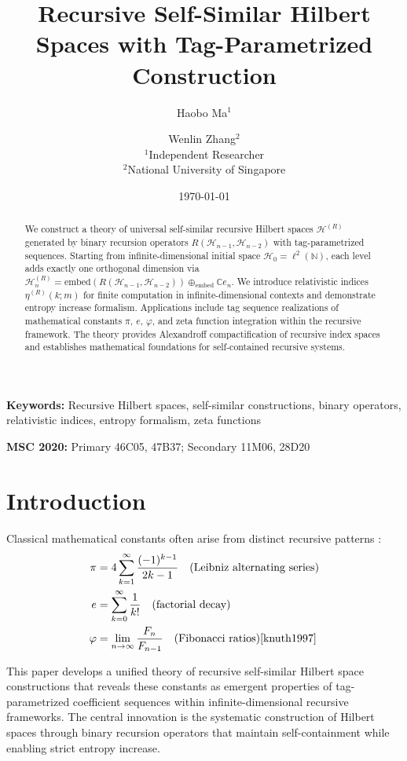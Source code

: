 \documentclass[12pt]{article}
\title{Recursive Self-Similar Hilbert Spaces with Tag-Parametrized Construction}
\author{Haobo Ma$^1$ \and Wenlin Zhang$^2$\\
\small $^1$Independent Researcher\\
\small $^2$National University of Singapore}
\date{\today}
\theoremstyle{plain}
\theoremstyle{definition}
\begin{document}
\maketitle

\begin{abstract}
We construct a theory of universal self-similar recursive Hilbert spaces $\mathcal{H}^{(R)}$ generated by binary recursion operators $R(\mathcal{H}_{n-1}, \mathcal{H}_{n-2})$ with tag-parametrized sequences. Starting from infinite-dimensional initial space $\mathcal{H}_0 = \ell^2(\mathbb{N})$, each level adds exactly one orthogonal dimension via $\mathcal{H}_n^{(R)} = \text{embed}(R(\mathcal{H}_{n-1}, \mathcal{H}_{n-2})) \oplus_{\text{embed}} \mathbb{C} e_n$. We introduce relativistic indices $\eta^{(R)}(k; m)$ for finite computation in infinite-dimensional contexts and demonstrate entropy increase formalism. Applications include tag sequence realizations of mathematical constants $\pi$, $e$, $\varphi$, and zeta function integration within the recursive framework. The theory provides Alexandroff compactification of recursive index spaces and establishes mathematical foundations for self-contained recursive systems.
\end{abstract}

\noindent\textbf{Keywords:} Recursive Hilbert spaces, self-similar constructions, binary operators, relativistic indices, entropy formalism, zeta functions

\noindent\textbf{MSC 2020:} Primary 46C05, 47B37; Secondary 11M06, 28D20

\section{Introduction}

Classical mathematical constants often arise from distinct recursive patterns \cite{hardy1979}:
\begin{align}
\pi &= 4 \sum_{k=1}^{\infty} \frac{(-1)^{k-1}}{2k-1} \quad \text{(Leibniz alternating series)} \\
e &= \sum_{k=0}^{\infty} \frac{1}{k!} \quad \text{(factorial decay)} \\
\varphi &= \lim_{n \to \infty} \frac{F_n}{F_{n-1}} \quad \text{(Fibonacci ratios)} \cite{knuth1997}
\end{align}

This paper develops a unified theory of recursive self-similar Hilbert space constructions that reveals these constants as emergent properties of tag-parametrized coefficient sequences within infinite-dimensional recursive frameworks. The central innovation is the systematic construction of Hilbert spaces through binary recursion operators that maintain self-containment while enabling strict entropy increase.
\end{document}
